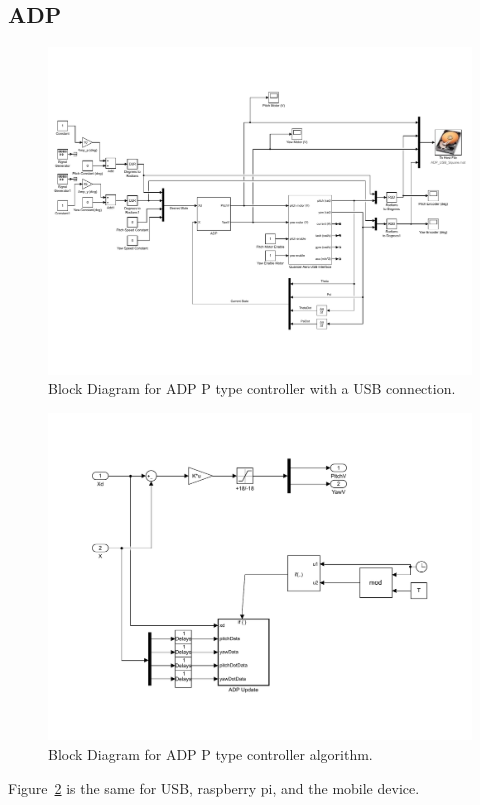 \subsection{ADP}
\begin{figure}[!htbp]
    \centering
    \includegraphics[width=.8\textwidth,keepaspectratio=true]{figs/img/ADP_USB}
    \caption{Block Diagram for ADP P type controller with a USB connection.}
    \label{fig:ADP_P_USB_Block_Diagram}
\end{figure}
\begin{figure}[!htbp]
    \centering
    \includegraphics[width=.8\textwidth,keepaspectratio=true]{figs/img/ADP_Black_Box}
    \caption{Block Diagram for ADP P type controller algorithm.}
    \label{fig:ADP_P_BlackBox}
\end{figure}
Figure~\ref{fig:ADP_P_BlackBox} is the same for USB, raspberry pi, and the mobile device.

